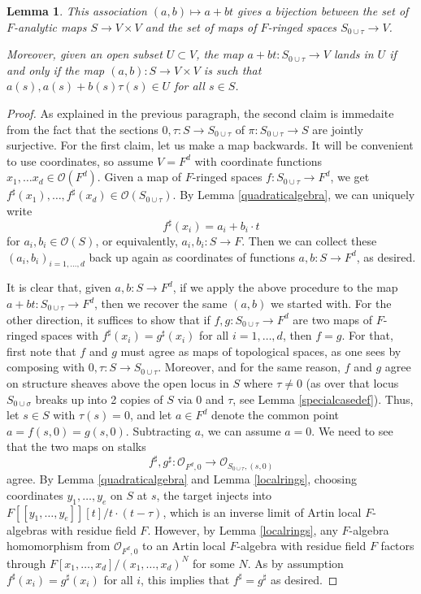 \documentclass[12pt]{article}
\newtheorem{lemma}[theorem]{Lemma}
\begin{document}
\begin{lemma}\label{technicaldeflemma}
This association $(a,b)\mapsto a+bt$ gives a bijection between the set of $F$-analytic maps $S\rightarrow V\times V$ and the set of maps of $F$-ringed spaces $S_{0\cup \tau}\rightarrow V$.

Moreover, given an open subset $U\subset V$, the map $a+bt:S_{0\cup \tau}\rightarrow V$ lands in $U$ if and only if the map $(a,b):S\rightarrow V\times V$ is such that $a(s),a(s)+b(s)\tau(s)\in U$ for all $s\in S$.
\end{lemma}
\begin{proof}
As explained in the previous paragraph, the second claim is immedaite from the fact that the sections $0,\tau:S\rightarrow S_{0\cup \tau}$ of $\pi:S_{0\cup \tau}\rightarrow S$ are jointly surjective.
For the first claim, let us make a map backwards.  It will be convenient to use coordinates, so assume $V=F^d$ with coordinate functions $x_1,\ldots x_d\in\mathcal{O}(F^d)$.  Given a map of $F$-ringed spaces $f:S_{0\cup \tau}\rightarrow F^d$, we get $f^\sharp(x_1),\ldots,f^\sharp(x_d)\in \mathcal{O}(S_{0\cup \tau})$.  By Lemma \ref{quadraticalgebra}, we can uniquely write
$$f^\sharp(x_i) = a_i + b_i\cdot t$$
for $a_i,b_i\in \mathcal{O}(S)$, or equivalently, $a_i,b_i:S\rightarrow F$.  Then we can collect these $(a_i,b_i)_{i=1,\ldots,d}$ back up again as coordinates of functions $a,b:S\rightarrow F^d$, as desired.

It is clear that, given $a,b:S\rightarrow F^d$, if we apply the above procedure to the map $a+bt:S_{0\cup \tau}\rightarrow F^d$, then we recover the same $(a,b)$ we started with.  For the other direction, it suffices to show that if $f,g:S_{0\cup \tau}\rightarrow F^d$ are two maps of $F$-ringed spaces with $f^\sharp(x_i)=g^\sharp(x_i)$ for all $i=1,\ldots,d$, then $f=g$.  For that, first note that $f$ and $g$ must agree as maps of topological spaces, as one sees by composing with $0,\tau:S\rightarrow S_{0\cup \tau}$.  Moreover, and for the same reason, $f$ and $g$ agree on structure sheaves above the open locus in $S$ where $\tau\neq 0$ (as over that locus $S_{0\cup \sigma}$ breaks up into 2 copies of $S$ via $0$ and $\tau$, see Lemma \ref{specialcasedef}).  Thus, let $s\in S$ with $\tau(s)=0$, and let $a\in F^d$ denote the common point $a=f(s,0)=g(s,0)$.  Subtracting $a$, we can assume $a=0$.  We need to see that the two maps on stalks
$$f^\sharp,g^\sharp: \mathcal{O}_{F^d,0}\rightarrow \mathcal{O}_{S_{0\cup \tau},(s,0)}$$
agree.  By Lemma \ref{quadraticalgebra} and Lemma \ref{localrings}, choosing coordinates $y_1,\ldots,y_e$ on $S$ at $s$, the target injects into $F[[y_1,\ldots,y_e]][t]/t\cdot(t-\tau)$, which is an inverse limit of Artin local $F$-algebras with residue field $F$.  However, by Lemma \ref{localrings}, any $F$-algebra homomorphism from $\mathcal{O}_{F^d,0}$ to an Artin local $F$-algebra with residue field $F$ factors through $F[x_1,\ldots,x_d]/(x_1,\ldots,x_d)^N$ for some $N$.  As by assumption $f^\sharp(x_i)=g^\sharp(x_i)$ for all $i$, this implies that $f^\sharp=g^\sharp$ as desired.
\end{proof}
\end{document}
